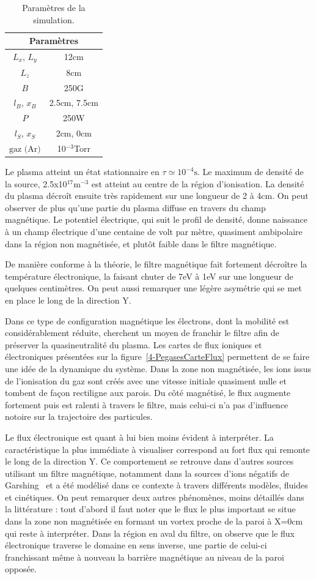 \begin{refsection}
\begin{table}[!htbp]
\begin{tabular}{cc}
\multicolumn{2}{c}{\bf Paramètres}\\
\midrule 
$L_x$, $L_y$ & 12cm\\
$L_z$ & 8cm\\
$B$&250G\\
$l_B$, $x_B$&2.5cm, 7.5cm\\
$P$&250W\\
$l_S$, $x_S$&2cm, 0cm\\
$\text{gaz (Ar)}$ & 10$^{-3}$Torr\\
\bottomrule
\end{tabular}
\caption{Paramètres de la simulation.}\label{2-TokamParam1}
\end{table}
Le plasma atteint un état stationnaire en $\tau\simeq 10^{-4}\text{s}$. Le
maximum de densité de la source, 2.5x10$^{17}\text{m}^{-3}$ est atteint au
centre de la région d'ionisation. La densité du plasma décroît ensuite très
rapidement sur une longueur de 2 à 4cm. On peut observer de plus qu'une partie
du plasma diffuse en travers du champ magnétique. Le potentiel électrique, qui
suit le profil de densité, donne naissance à un champ électrique d'une centaine
de volt par mètre, quasiment ambipolaire dans la région non magnétisée, et
plutôt faible dans le filtre magnétique.

De manière conforme à la théorie, le filtre magnétique fait fortement décroître
la température électronique, la faisant chuter de 7eV à 1eV sur une
longueur de quelques centimètres. On peut aussi remarquer une légère asymétrie qui se met en
place le long de la direction Y. 

Dans ce type de configuration
magnétique les électrons, dont la mobilité est considérablement réduite,
cherchent un moyen de franchir le filtre afin de préserver la quasineutralité du
plasma. Les cartes de flux ioniques et électroniques présentées sur la figure~\ref{4-PegasesCarteFlux} permettent de se faire une idée de la dynamique
du système. Dans la zone non magnétisée, les ions issus de l'ionisation du gaz
sont créés avec une vitesse initiale quasiment nulle et tombent de façon
rectiligne aux parois. Du côté magnétisé, le flux augmente fortement puis est
ralenti à travers le filtre, mais celui-ci n'a pas d'influence notoire sur la
trajectoire des particules.

Le flux électronique est quant à lui bien moins évident à interpréter. La
caractéristique la plus immédiate à visualiser correspond au fort flux qui
remonte le long de la direction Y. Ce comportement se retrouve dans d'autres
sources utilisant un filtre magnétique, notamment dans la
sources d'ions négatifs de Garshing~\parencite{Fantz} et a été modélisé
dans ce contexte à travers différents
modèles, fluides et cinétiques\parencite{PIC2D,PIC3D,MAGMA}. On peut remarquer
deux autres phénomènes, moins détaillés dans la littérature : tout d'abord il
faut noter que le flux le plus important se situe dans la zone non magnétisée en
formant un vortex proche de la paroi à X=0cm qui reste à interpréter. Dans la
région en aval du filtre, on observe que le flux
électronique traverse le domaine en sens inverse, une partie
de celui-ci franchissant même à nouveau la barrière magnétique au niveau de la
paroi opposée.


\end{refsection}
